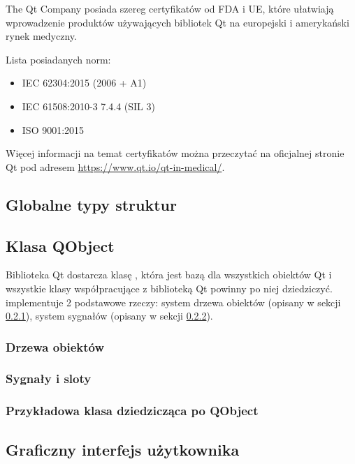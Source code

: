 \par
The Qt Company posiada szereg certyfikatów od FDA i UE, które ułatwiają wprowadzenie produktów używających bibliotek Qt na europejski i amerykański rynek medyczny.
\par
Lista posiadanych norm:
\begin{itemize}
    \item IEC 62304:2015 (2006 + A1)
    \item IEC 61508:2010-3 7.4.4 (SIL 3)
    \item ISO 9001:2015 
\end{itemize}
Więcej informacji na temat certyfikatów można przeczytać na oficjalnej stronie Qt pod adresem \url{https://www.qt.io/qt-in-medical/}.

\subsection{Globalne typy struktur}
\label{sec:qt-typedefs}


\subsection{Klasa QObject}

\qtclassExplanations

\par
Biblioteka Qt dostarcza klasę , która jest bazą dla wszystkich obiektów Qt i wszystkie klasy współpracujące z biblioteką Qt powinny po niej dziedziczyć.
 implementuje 2 podstawowe rzeczy: system drzewa obiektów (opisany w sekcji \ref{sec:qt-pareting}), system sygnałów (opisany w sekcji \ref{sec:qt-signals}).

\subsubsection{Drzewa obiektów}
\label{sec:qt-pareting}


\subsubsection{Sygnały i sloty}
\label{sec:qt-signals}


\subsubsection{Przykładowa klasa dziedzicząca po QObject}


\subsection{Graficzny interfejs użytkownika}
\label{sec:qt-gui}

